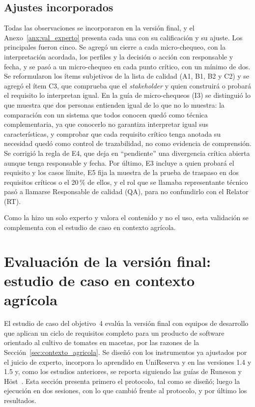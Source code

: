 \documentclass[12pt,letterpaper,oneside]{report}
\begin{document}
\subsection{Ajustes incorporados}
Todas las observaciones se incorporaron en la versión final, y el
Anexo~\ref{anx:val_experto} presenta cada una con su calificación y su ajuste.
Los principales fueron cinco. Se agregó un cierre a cada micro-chequeo, con la
interpretación acordada, los perfiles y la decisión o acción con responsable y
fecha, y se pasó a un micro-chequeo en cada punto crítico, con un mínimo de dos.
Se reformularon los ítems subjetivos de la lista de calidad (A1, B1, B2 y C2) y
se agregó el ítem C3, que comprueba que el \textit{stakeholder} y quien
construirá o probará el requisito lo interpretan igual. En la guía de micro-chequeos (I3)
se distinguió lo que muestra que dos personas entienden igual de lo que no lo
muestra: la comparación con un sistema que todos conocen quedó como técnica
complementaria, ya que conocerlo no garantiza interpretar igual sus
características, y comprobar que cada requisito crítico tenga anotada su
necesidad quedó como control de trazabilidad, no como evidencia de comprensión.
Se corrigió la regla de E4, que deja en
``pendiente'' una divergencia crítica abierta aunque tenga responsable y fecha.
Por último, E3 incluye a quien probará el requisito y los casos límite, E5 fija
la muestra de la prueba de traspaso en dos requisitos críticos o el 20\,\% de
ellos, y el rol que se llamaba representante técnico pasó a llamarse
Responsable de calidad (QA), para no confundirlo con el Relator (RT).

Como la hizo un solo experto y valora el contenido y no el uso, esta validación
se complementa con el estudio de caso en contexto agrícola.


\section{Evaluación de la versión final: estudio de caso en contexto agrícola}
\label{sec:caso_agricola}
El estudio de caso del objetivo~4 evalúa la versión final con equipos de
desarrollo que aplican un ciclo de requisitos completo para un producto de
software orientado al cultivo de tomates en macetas, por las razones de la
Sección~\ref{sec:contexto_agricola}. Se diseñó con los instrumentos ya
ajustados por el juicio de experto, incorpora lo aprendido en UniReserva y en
las versiones 1.4 y 1.5 y, como los estudios anteriores, se reporta siguiendo
las guías de Runeson y Höst~\cite{runeson2009case}. Esta sección presenta
primero el protocolo, tal como se diseñó; luego la ejecución en dos sesiones,
con lo que cambió frente al protocolo, y por último los resultados.
\end{document}
